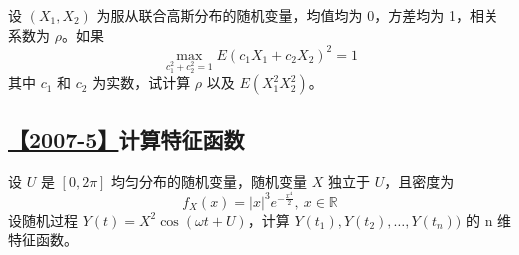 设 $(X_1, X_2)$ 为服从联合高斯分布的随机变量，均值均为 0，方差均为 1，相关
系数为 $\rho$。如果
$$
\max_{c_1^2+c_2^2=1}E(c_1X_1+c_2X_2)^2=1
$$
其中 $c_1$ 和 $c_2$ 为实数，试计算 $\rho$ 以及 $E(X_1^2X_2^2)$。

\subsection{\hyperref[A2007-5]{【2007-5】}计算特征函数}\label{Q2007-5}

设 $U$ 是 $[0, 2\pi]$ 均匀分布的随机变量，随机变量 $X$ 独立于 $U$，且密度为
$$
f_X(x)=|x|^3e^{-\frac{x^4}{2}}, \ x\in\mathbb{R}
$$
设随机过程 $Y(t)=X^2\cos(\omega t+U)$，计算 $Y(t_1), Y(t_2), \dots, Y(t_n))$ 的 n 维特征函数。